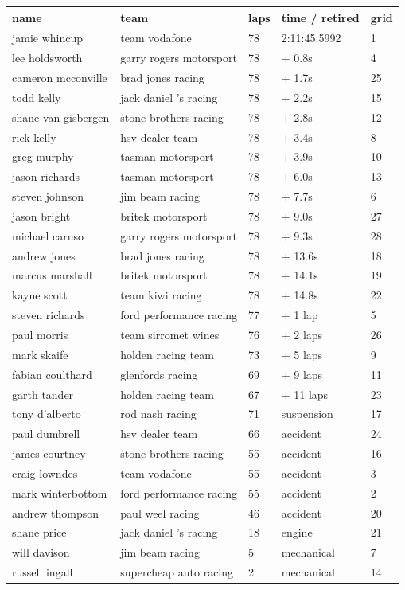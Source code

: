 \documentclass{article}
\begin{document}
\begin{tabular}{lllll}
\toprule
name & team & laps & time / retired & grid \\
\midrule
jamie whincup & team vodafone & 78 & 2:11:45.5992 & 1 \\
lee holdsworth & garry rogers motorsport & 78 & + 0.8s & 4 \\
cameron mcconville & brad jones racing & 78 & + 1.7s & 25 \\
todd kelly & jack daniel 's racing & 78 & + 2.2s & 15 \\
shane van gisbergen & stone brothers racing & 78 & + 2.8s & 12 \\
rick kelly & hsv dealer team & 78 & + 3.4s & 8 \\
greg murphy & tasman motorsport & 78 & + 3.9s & 10 \\
jason richards & tasman motorsport & 78 & + 6.0s & 13 \\
steven johnson & jim beam racing & 78 & + 7.7s & 6 \\
jason bright & britek motorsport & 78 & + 9.0s & 27 \\
michael caruso & garry rogers motorsport & 78 & + 9.3s & 28 \\
andrew jones & brad jones racing & 78 & + 13.6s & 18 \\
marcus marshall & britek motorsport & 78 & + 14.1s & 19 \\
kayne scott & team kiwi racing & 78 & + 14.8s & 22 \\
steven richards & ford performance racing & 77 & + 1 lap & 5 \\
paul morris & team sirromet wines & 76 & + 2 laps & 26 \\
mark skaife & holden racing team & 73 & + 5 laps & 9 \\
fabian coulthard & glenfords racing & 69 & + 9 laps & 11 \\
garth tander & holden racing team & 67 & + 11 laps & 23 \\
tony d'alberto & rod nash racing & 71 & suspension & 17 \\
paul dumbrell & hsv dealer team & 66 & accident & 24 \\
james courtney & stone brothers racing & 55 & accident & 16 \\
craig lowndes & team vodafone & 55 & accident & 3 \\
mark winterbottom & ford performance racing & 55 & accident & 2 \\
andrew thompson & paul weel racing & 46 & accident & 20 \\
shane price & jack daniel 's racing & 18 & engine & 21 \\
will davison & jim beam racing & 5 & mechanical & 7 \\
russell ingall & supercheap auto racing & 2 & mechanical & 14 \\
\bottomrule
\end{tabular}
\end{document}
